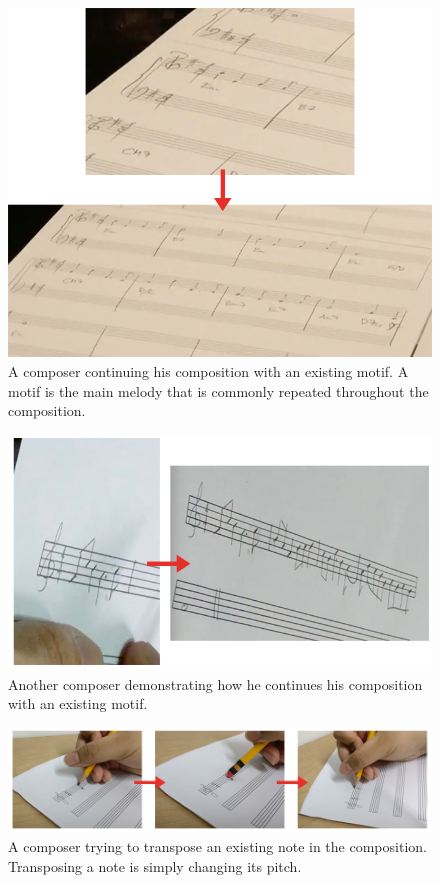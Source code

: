 		\begin{figure}[H]
			\centering
			\includegraphics[scale=0.52]{figures/motif-magsalin.png}
		    \caption{A composer continuing his composition with an existing motif. A motif is the main melody that is commonly repeated throughout the composition.}
		    \label{fig:motif-magsalin}
		\end{figure}

		\begin{figure}[H]
			\centering
			\includegraphics[scale=0.6]{figures/motif-anthony.png}
		    \caption{Another composer demonstrating how he continues his composition with an existing motif.}
		    \label{fig:motif-anthony}
		\end{figure}

		\begin{figure}[H]
			\centering
			\includegraphics[scale=0.46]{figures/handwritten-transpose-erase.png}
		    \caption{A composer trying to transpose an existing note in the composition. Transposing a note is simply changing its pitch.}
		    \label{fig:handwritten-transpose-erase}
		\end{figure}

